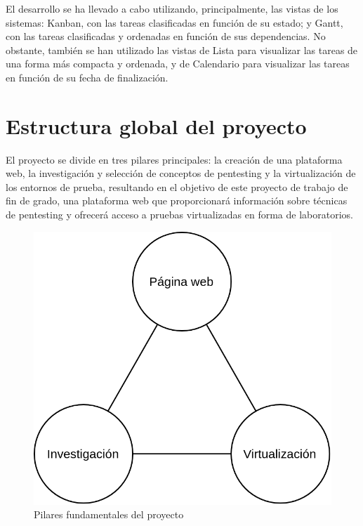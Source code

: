         El desarrollo se ha llevado a cabo utilizando, principalmente, las vistas de los sistemas: Kanban, con las tareas clasificadas en función de su estado; y Gantt, con las tareas clasificadas y ordenadas en función de sus dependencias. No obstante, también se han utilizado las vistas de Lista para visualizar las tareas de una forma más compacta y ordenada, y de Calendario para visualizar las tareas en función de su fecha de finalización.
        
        \newpage
    
    \section{Estructura global del proyecto}
        \label{sec:estructura-global}
        
        El proyecto se divide en tres pilares principales: la creación de una plataforma web, la investigación y selección de conceptos de pentesting y la virtualización de los entornos de prueba, resultando en el objetivo de este proyecto de trabajo de fin de grado, una plataforma web que proporcionará información sobre técnicas de pentesting y ofrecerá acceso a pruebas virtualizadas en forma de laboratorios. 
        
        \begin{figure}[h]
            \centering
            \includegraphics[scale=0.30]{images/Diagramas/Estructura global.png}
            \caption{Pilares fundamentales del proyecto}
            \label{fig:estructura-global}
        \end{figure}
            
